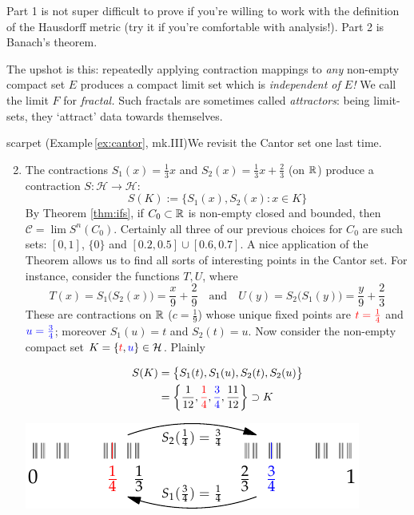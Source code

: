 Part 1 is not super difficult to prove if you're willing to work with the definition of the Hausdorff metric (try it if you're comfortable with analysis!). Part 2 is Banach's theorem.\smallbreak

The upshot is this: repeatedly applying contraction mappings to \emph{any} non-empty compact set $E$ produces a compact limit set which is \emph{independent of $E$!} We call the limit $F$ for \emph{fractal.} Such fractals are sometimes called \emph{attractors}: being limit-sets, they `attract' data towards themselves.


\begin{examples}{}{scarpet}
	\exstart (Example\,\ref{ex:cantor}, mk.III)\lstsp We revisit the Cantor set one last time.
	\begin{enumerate}\setcounter{enumi}{1}
	  \item[]The contractions $S_1(x)=\frac 13x$ and $S_2(x)=\frac 13x+\frac 23$ (on $\mathbb{R}$) produce a contraction $S:\mathcal H\to\mathcal H$:
		\[
			S(K):=\bigl\{S_1(x),S_2(x):x\in K\bigr\}
		\]
		By Theorem \ref{thm:ifs}, if $C_0\subset\mathbb{R}$ is non-empty closed and bounded, then  $\mathcal C=\lim S^n(C_0)$. Certainly all three of our previous choices for $C_0$ are such sets: $[0,1]$, $\{0\}$ and $[0.2,0.5]\cup[0.6,0.7]$.\smallbreak
		A nice application of the Theorem allows us to find all sorts of interesting points in the Cantor set. For instance, consider the functions $T,U$, where
		\[
			T(x)=S_1\bigl(S_2(x)\bigr)=\frac x9+\frac 29
			\quad\text{and}\quad
			U(y)=S_2\bigl(S_1(y)\bigr)=\frac y9+\frac 23
		\]
		These are contractions on $\mathbb{R}$ ($c=\frac 19$) whose unique fixed points are $\textcolor{red}{t=\frac 14}$ and $\textcolor{blue}{u=\frac 34}$; moreover $S_1(u)=t$ and $S_2(t)=u$. Now consider the non-empty compact set $K=\{\textcolor{red}{t},\textcolor{blue}{u}\}\in\mathcal H$. Plainly\par
		\begin{minipage}[t]{0.5\linewidth}\vspace{-14pt}
			\begin{align*}
				S(K)&=\bigl\{S_1(t),S_1(u),S_2(t),S_2(u)\bigr\}\\
				&=\left\{\frac 1{12},\textcolor{red}{\frac 14},\textcolor{blue}{\frac 34},\frac{11}{12}\right\}
				\supset K
			\end{align*}
		\end{minipage}
		\hfill
		\begin{minipage}[t]{0.45\linewidth}\vspace{-3pt}
			\flushright\includegraphics{cantor-set2}
		\end{minipage}\medbreak
	

\end{enumerate}
\end{examples}
